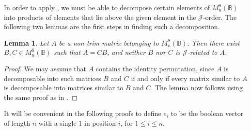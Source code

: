 \documentclass[11pt]{article}
\newtheorem{lemma}[thm]{Lemma}
\numberwithin{equation}{section}
\newcommand{\B}{\mathbb{B}}
\newcommand{\Halln}{M_n^{\text{S}}(\B)}
\newcommand{\J}{\mathscr{J}}
\begin{document}
In order to apply , we must be able to decompose
certain elements of $\Halln$ into products of elements that lie above the given
element in the $\J$-order. The following two lemmas are the first steps in
finding such a decomposition.

\begin{lemma}
  Let $A$ be a non-trim matrix belonging to $\Halln$. Then there exist $B, C \in
  \Halln$ such that $A = CB$, and neither $B$ nor $C$ is $\J$-related to $A$.
\end{lemma}
\begin{proof}
  We may assume that $A$ contains the identity permutation, since $A$ is
  decomposable into such matrices $B$ and $C$ if and only if every matrix
  similar to $A$ is decomposable into matrices similar to $B$ and $C$. The lemma
  now follows using the same proof as in
  .
\end{proof}

It will be convenient in the following proofs to define $e_i$ to be the boolean
vector of length $n$ with a single $1$ in position $i$, for $1 \leq i \leq n$.
\end{document}
